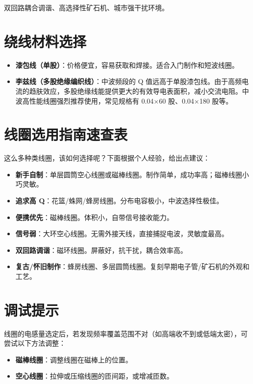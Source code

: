 \documentclass[12pt,UTF8]{ctexbook}
\begin{document}
双回路耦合调谐、高选择性矿石机、城市强干扰环境。


\section{绕线材料选择}

\begin{itemize}[leftmargin=2cm]
	\item \textbf{漆包线（单股）}：价格便宜，容易获取和焊接。适合入门制作和短波线圈。
	\item \textbf{李兹线（多股绝缘编织线）}：中波频段的 Q 值远高于单股漆包线。由于高频电流的趋肤效应，多股绝缘线能提供更大的有效导电表面积，减小交流电阻。中波高性能线圈强烈推荐使用，常见规格有 0.04×60 股、0.04×180 股等。
\end{itemize}


\section{线圈选用指南速查表}

这么多种类线圈，该如何选择呢？下面根据个人经验，给出点建议：

\begin{itemize}[leftmargin=2cm]
	\item \textbf{新手自制}：单层圆筒空心线圈或磁棒线圈。制作简单，成功率高；磁棒线圈小巧灵敏。
	\item \textbf{追求高 Q}：花篮/蛛网/蜂房线圈。分布电容极小，中波选择性极佳。
	\item \textbf{便携优先}：磁棒线圈。体积小，自带信号接收能力。
	\item \textbf{信号弱}：大环空心线圈。无需外接天线，直接捕捉电波，灵敏度最高。
	\item \textbf{双回路调谐}：磁环线圈。屏蔽好，抗干扰，耦合效率高。
	\item \textbf{复古/怀旧制作}：蜂房线圈、多层圆筒线圈。复刻早期电子管/矿石机的外观和工艺。
\end{itemize}

\section{调试提示}

线圈的电感量选定后，若发现频率覆盖范围不对（如高端收不到或低端太密），可尝试以下方法调整：

\begin{itemize}[leftmargin=2cm]
	\item \textbf{磁棒线圈}：调整线圈在磁棒上的位置。
	\item \textbf{空心线圈}：拉伸或压缩线圈的匝间距，或增减匝数。
\end{itemize}
\end{document}
